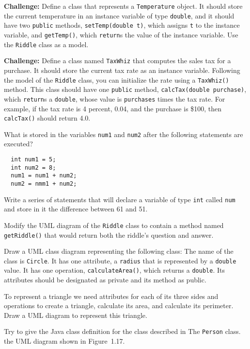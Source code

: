 \begin{EXRtwo}
\item  {\bf Challenge:} Define a class that represents a {\tt Temperature}
object.   It should store the current temperature in an instance
variable of type {\tt double}, and it should have two {\tt public}
methods, {\tt setTemp(double t)}, which assigns {\tt t} to the
instance variable, and {\tt getTemp()}, which {\tt return}s the value
of the instance variable.   Use the {\tt Riddle} class as a model.

\item  {\bf Challenge:} Define a class named {\tt TaxWhiz} that computes the
sales tax for a purchase.  It should store the current tax rate as an
instance variable.   Following the model of the {\tt Riddle} class,
you can initialize the rate using a {\tt TaxWhiz()} method.   This
class should have one {\tt public} method, {\tt calcTax(double
purchase)}, which {\tt return}s a {\tt double}, whose value is
{\tt purchases} times the tax rate.  For example, if the tax rate is 4
percent, 0.04, and the purchase is \$100, then
{\tt calcTax()} should return 4.0.

\item What is stored in the variables {\tt num1} and {\tt num2} after the
following statements are executed?
\small
\begin{verbatim}
  int num1 = 5;
  int num2 = 8;
  num1 = num1 + num2;
  num2 = nmm1 + num2;
\end{verbatim}
\normalsize

\item Write a series of statements that will declare a variable of type {\tt int}
called {\tt num} and store in it the difference between 61 and 51.


\item Modify the UML diagram of the {\tt Riddle}
class to contain a method named {\tt getRiddle()} that would return
both the riddle's question and answer.

\item Draw a UML class diagram representing the following
class: The name of the class is {\tt Circle}. It has one
attribute, a {\tt radius} that is represented by a {\tt double}
value. It has one operation, {\tt calculateArea()}, which
returns a {\tt double}. Its attributes should be designated
as private and its method as public.

\item To represent a triangle we need attributes for each of its three
sides and operations to create a triangle, calculate its area, and calculate
its perimeter. Draw a UML diagram to represent this triangle.

\item Try to give the Java class definition for the class described in
%
{The {\tt Person} class.
\label{fig-person}
\label{pg-person}}
the UML diagram shown in Figure~1.17.

\end{EXRtwo}

